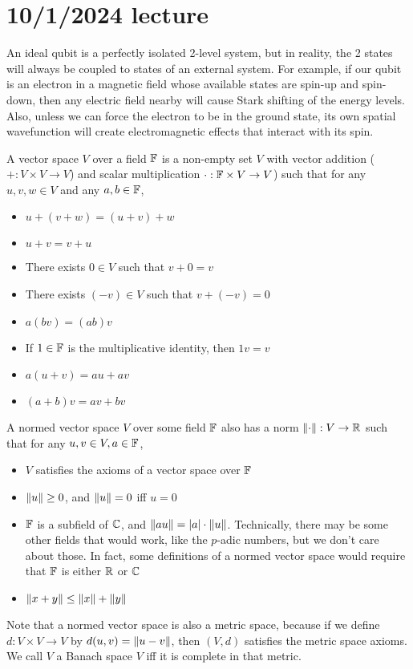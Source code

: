 \documentclass{article}
\begin{document}
\section{10/1/2024 lecture}
An ideal qubit is a perfectly isolated 2-level system, but in reality, the 2 states will always be coupled to states of an external system. For example, if our qubit is an electron in a magnetic field whose available states are spin-up and spin-down, then any electric field nearby will cause Stark shifting of the energy levels. Also, unless we can force the electron to be in the ground state, its own spatial wavefunction will create electromagnetic effects that interact with its spin.
\bigskip
\par
A vector space $V$ over a field $\mathbb{F}$ is a non-empty set $V$ with vector addition ($+ : V \times V \rightarrow V$) and scalar multiplication $\cdot : \mathbb{F} \times V \rightarrow V$) such that for any $u,v,w \in V$ and any $a,b \in \mathbb{F}$,
\begin{itemize}[noitemsep]
    \item $u+(v+w)=(u+v)+w$
    \item $u+v=v+u$
    \item There exists $0 \in V$ such that $v+0=v$
    \item There exists $(-v) \in V$ such that $v+(-v)=0$
    \item $a(bv)=(ab)v$
    \item If $1 \in \mathbb{F}$ is the multiplicative identity, then $1v=v$
    \item $a(u+v)=au+av$
    \item $(a+b)v=av+bv$
\end{itemize}
A  normed vector space $V$ over some field $\mathbb{F}$ also has a norm $\left\lVert \cdot\right\rVert : V \rightarrow \mathbb{R}$ such that for any $u,v \in V, a \in \mathbb{F}$,
\begin{itemize}[noitemsep]
    \item $V$ satisfies the axioms of a vector space over $\mathbb{F}$
    \item $\left\lVert u\right\rVert \geq 0$, and $\left\lVert u\right\rVert=0$ iff $u=0$
    \item $\mathbb{F}$ is a subfield of $\mathbb{C}$, and $\left\lVert au\right\rVert=\left\lvert a \right\rvert \cdot \left\lVert u\right\rVert$. Technically, there may be some other fields that would work, like the $p$-adic numbers, but we don't care about those. In fact, some definitions of a normed vector space would require that $\mathbb{F}$ is either $\mathbb{R}$ or $\mathbb{C}$
    \item $\left\lVert x+y\right\rVert\leq \left\lVert x\right\rVert+\left\lVert y\right\rVert$
\end{itemize}
Note that a normed vector space is also a metric space, because if we define $d: V \times V \rightarrow V$ by $d(u,v)=\left\lVert u-v\right\rVert$, then $(V, d)$ satisfies the metric space axioms. We call $V$ a Banach space $V$ iff it is complete in that metric.
\end{document}
